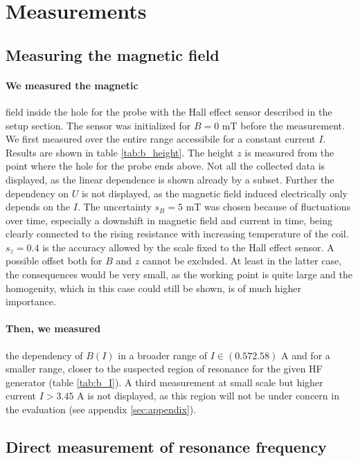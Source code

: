 \section{Measurements}

\subsection{Measuring the magnetic field}
\paragraph{We measured the magnetic} 
field inside the hole for the probe with the Hall effect sensor described in the setup section. 
The sensor was initialized for $B = 0$ mT before the measurement. We first measured over the 
entire range accessibile for a constant current $I$. Results are shown in table \ref{tab:b_height}. 
The height $z$ is measured from the point where the hole for the probe ends above. 
Not all the collected data is displayed, as the linear dependence is shown already by a subset. Further 
the dependency on $U$ is not displayed, as the magnetic field induced electrically only depends on the 
$I$. The uncertainty $s_B = 5$ mT was chosen because of fluctuations over time, especially a 
downshift in magnetic field and current in time, being clearly connected to the rising resistance with 
increasing temperature of the coil. $s_z = 0.4$ is the accuracy allowed by the scale fixed to the 
Hall effect sensor. A possible offset both for $B$ and $z$ cannot be excluded. At least in the latter case, 
the consequences would be very small, as the working point is quite large and the homogenity, which 
in this case could still be shown, is of much higher importance. 

 
\paragraph{Then, we measured} 
the dependency of $B(I)$ in a broader range of $I \in (0.57 2.58)$ A 
and for a smaller range, closer to the suspected region of resonance 
for the given HF generator (table \ref{tab:b_I}). A third measurement at small scale 
but higher current $I > 3.45$ A is not displayed, as this region will not be under 
concern in the evaluation (see appendix \ref{sec:appendix}). 

\FloatBarrier

\subsection{Direct measurement of resonance frequency}
\label{sec:measure_direct}
